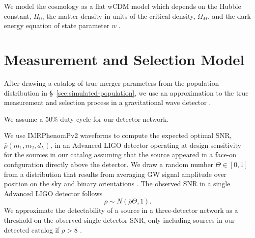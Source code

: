 \documentclass[modern]{aastex62}
\begin{document}
We model the cosmology as a flat wCDM model which depends on the Hubble
constant, $H_0$, the matter density in units of the critical density,
$\Omega_M$, and the dark energy equation of state parameter $w$
\citep{Hogg1999}.

\section{Measurement and Selection Model}
\label{sec:measurement}

After drawing a catalog of true merger parameters from the population
distribution in \S\ \ref{sec:simulated-population}, we use an approximation
\citep{Fishbach2018} to the true measurement and selection process in a
gravitational wave detector \citep{Veitch2015}.

We assume a 50\% duty cycle for our detector network.

We use IMRPhenomPv2 waveforms \citep{Hannam2014} to compute the expected optimal
\ac{SNR}, $\bar{\rho}\left( m_1, m_2, d_L \right)$, in an Advanced LIGO detector
operating at design sensitivity \citep{ObsScenarios} for the sources in our
catalog assuming that the source appeared in a face-on configuration directly
above the detector.  We draw a random number $\Theta \in [0,1]$ from a
distribution that results from averaging \ac{GW} signal amplitude over position
on the sky and binary orientations \citep{Finn1993}.  The observed \ac{SNR} in a
single Advanced LIGO detector follows
%
\begin{equation}
  \rho \sim N\left( \bar{\rho} \Theta, 1 \right).
\end{equation}
%
We approximate the detectability of a source in a three-detector network as a
threshold on the observed single-detector \ac{SNR}, only including sources in
our detected catalog if $\rho > 8$ \citep{GW150914RateSupplement}.
\end{document}
